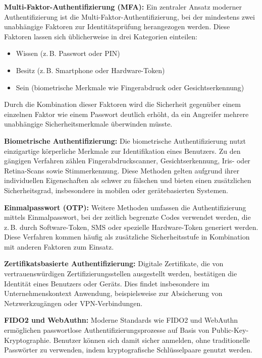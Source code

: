 \textbf{Multi-Faktor-Authentifizierung (MFA):}  
Ein zentraler Ansatz moderner Authentifizierung ist die Multi-Faktor-Authentifizierung, bei der mindestens zwei unabhängige Faktoren zur Identitätsprüfung herangezogen werden. Diese Faktoren lassen sich üblicherweise in drei Kategorien einteilen:

\begin{itemize}
    \item Wissen (z.\,B. Passwort oder PIN)
    \item Besitz (z.\,B. Smartphone oder Hardware-Token)
    \item Sein (biometrische Merkmale wie Fingerabdruck oder Gesichtserkennung)
\end{itemize}

Durch die Kombination dieser Faktoren wird die Sicherheit gegenüber einem einzelnen Faktor wie einem Passwort deutlich erhöht, da ein Angreifer mehrere unabhängige Sicherheitsmerkmale überwinden müsste.\cite{it_schulungen_modern_auth}

\textbf{Biometrische Authentifizierung:}  
Die biometrische Authentifizierung nutzt einzigartige körperliche Merkmale zur Identifikation eines Benutzers. Zu den gängigen Verfahren zählen Fingerabdruckscanner, Gesichtserkennung, Iris- oder Retina-Scans sowie Stimmerkennung. Diese Methoden gelten aufgrund ihrer individuellen Eigenschaften als schwer zu fälschen und bieten einen zusätzlichen Sicherheitsgrad, insbesondere in mobilen oder gerätebasierten Systemen.\cite{it_schulungen_modern_auth}

\textbf{Einmalpasswort (OTP):}  
Weitere Methoden umfassen die Authentifizierung mittels Einmalpasswort, bei der zeitlich begrenzte Codes verwendet werden, die z.\,B. durch Software-Token, SMS oder spezielle Hardware-Token generiert werden. Diese Verfahren kommen häufig als zusätzliche Sicherheitsstufe in Kombination mit anderen Faktoren zum Einsatz.\cite{it_schulungen_modern_auth}

\textbf{Zertifikatsbasierte Authentifizierung:}  
Digitale Zertifikate, die von vertrauenswürdigen Zertifizierungsstellen ausgestellt werden, bestätigen die Identität eines Benutzers oder Geräts. Dies findet insbesondere im Unternehmenskontext Anwendung, beispielsweise zur Absicherung von Netzwerkzugängen oder VPN-Verbindungen.\cite{it_schulungen_modern_auth}

\textbf{FIDO2 und WebAuthn:}  
Moderne Standards wie FIDO2 und WebAuthn ermöglichen passwortlose Authentifizierungsprozesse auf Basis von Public-Key-Kryptographie. Benutzer können sich damit sicher anmelden, ohne traditionelle Passwörter zu verwenden, indem kryptografische Schlüsselpaare genutzt werden.\cite{it_schulungen_modern_auth}

